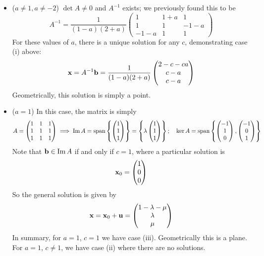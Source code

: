 \documentclass{article}
\begin{document}
\begin{itemize}
	\item ($a \neq 1, a \neq -2$) $\det A \neq 0$ and $A^{-1}$ exists; we previously found this to be
	      \[ A^{-1} = \frac{1}{(1-a)(2+a)}\begin{pmatrix}
			      1 & 1+a & 1 \\ 1 & 1 & -1-a \\ -1-a & 1 & 1
		      \end{pmatrix} \]
	      For these values of $a$, there is a unique solution for any $c$, demonstrating case (i) above:
	      \[ \vb x = A^{-1} \vb b = \frac{1}{(1-a)(2+a)}\begin{pmatrix}
			      2-c-ca \\ c-a \\ c-a
		      \end{pmatrix} \]
	      Geometrically, this solution is simply a point.
	\item ($a = 1$) In this case, the matrix is simply
	      \[ A = \begin{pmatrix}
			      1 & 1 & 1 \\ 1 & 1 & 1 \\ 1 & 1 & 1
		      \end{pmatrix} \implies \Im A = \operatorname{span} \left\{ \begin{pmatrix}
			      1 \\ 1 \\ 1
		      \end{pmatrix} \right\} = \left\{ \lambda\begin{pmatrix}
			      1 \\ 1 \\ 1
		      \end{pmatrix} \right\};\quad \ker A = \operatorname{span}\left\{ \begin{pmatrix}
			      -1 \\ 1 \\ 0
		      \end{pmatrix}, \begin{pmatrix}
			      -1 \\ 0 \\ 1
		      \end{pmatrix} \right\} \]
	      Note that $\vb b \in \Im A$ if and only if $c=1$, where a particular solution is
	      \[ \vb x_0 = \begin{pmatrix}
			      1 \\ 0 \\ 0
		      \end{pmatrix} \]
	      So the general solution is given by
	      \[ \vb x = \vb x_0 + \vb u = \begin{pmatrix}
			      1 - \lambda - \mu \\ \lambda \\ \mu
		      \end{pmatrix} \]
	      In summary, for $a=1$, $c=1$ we have case (iii). Geometrically this is a plane. For $a=1$, $c \neq 1$, we have case (ii) where there are no solutions.


\end{itemize}
\end{document}

